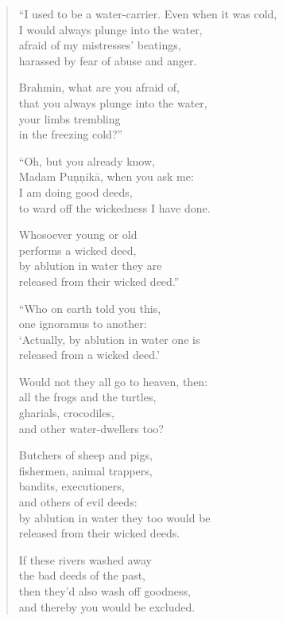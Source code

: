 \documentclass[12pt,openany]{book}%
\begin{document}
\begin{verse}%
“I used to be a water-carrier. Even when it was cold, \\
I would always plunge into the water, \\
afraid of my mistresses’ beatings, \\
harassed by fear of abuse and anger. 

Brahmin, what are you afraid of, \\
that you always plunge into the water, \\
your limbs trembling \\
in the freezing cold?” 

“Oh, but you already know, \\
Madam \textsanskrit{Puṇṇikā}, when you ask me: \\
I am doing good deeds, \\
to ward off the wickedness I have done. 

Whosoever young or old \\
performs a wicked deed, \\
by ablution in water they are \\
released from their wicked deed.” 

“Who on earth told you this, \\
one ignoramus to another: \\
‘Actually, by ablution in water one is \\
released from a wicked deed.’ 

Would not they all go to heaven, then: \\
all the frogs and the turtles, \\
gharials, crocodiles, \\
and other water-dwellers too? 

Butchers of sheep and pigs, \\
fishermen, animal trappers, \\
bandits, executioners, \\
and others of evil deeds: \\
by ablution in water they too would be \\
released from their wicked deeds. 

If these rivers washed away \\
the bad deeds of the past, \\
then they’d also wash off goodness, \\
and thereby you would be excluded. 


\end{verse}
\end{document}
